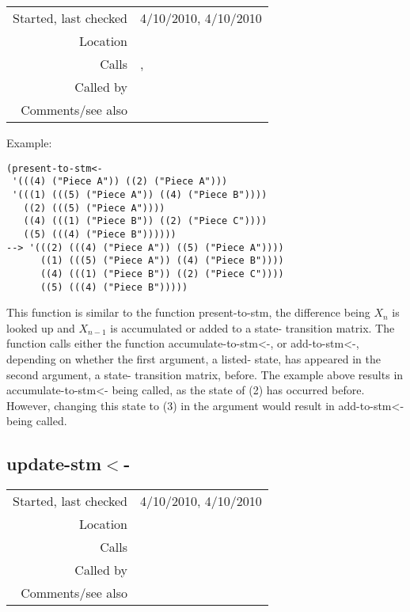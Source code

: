 \vspace{0.3cm}
\begin{tabular}{r|p{8cm}}
Started, last checked & 4/10/2010, 4/10/2010 \\
Location & \nameref{sec:markov-analyse-backwards} \\
Calls & \nameref{fun:add-to-stm<-}, \nameref{fun:accumulate-to-stm<-} \\
Called by & \nameref{fun:update-stm<-} \\
Comments/see also & \nameref{fun:present-to-stm}
\end{tabular}

\vspace{0.5cm}
\noindent Example:
\begin{verbatim}
(present-to-stm<-
 '(((4) ("Piece A")) ((2) ("Piece A")))
 '(((1) (((5) ("Piece A")) ((4) ("Piece B"))))
   ((2) (((5) ("Piece A"))))
   ((4) (((1) ("Piece B")) ((2) ("Piece C"))))
   ((5) (((4) ("Piece B"))))))
--> '(((2) (((4) ("Piece A")) ((5) ("Piece A"))))
      ((1) (((5) ("Piece A")) ((4) ("Piece B"))))
      ((4) (((1) ("Piece B")) ((2) ("Piece C"))))
      ((5) (((4) ("Piece B")))))
\end{verbatim}

\noindent This function is similar to the function
present-to-stm, the difference being $X_n$ is looked
up and $X_{n-1}$ is accumulated or added to a state-
transition matrix. The function calls either the
function accumulate-to-stm<-, or add-to-stm<-,
depending on whether the first argument, a listed-
state, has appeared in the second argument, a state-
transition matrix, before. The example above results
in accumulate-to-stm<- being called, as the state of
(2) has occurred before. However, changing this state
to (3) in the argument would result in add-to-stm<-
being called.


\subsection*{update-stm$<$-}\label{fun:update-stm<-}

\vspace{0.3cm}
\begin{tabular}{r|p{8cm}}
Started, last checked & 4/10/2010, 4/10/2010 \\
Location & \nameref{sec:markov-analyse-backwards} \\
Calls & \nameref{fun:present-to-stm<-} \\
Called by & \nameref{fun:markov-analyse<-} \\
Comments/see also & \nameref{fun:update-stm}
\end{tabular}

